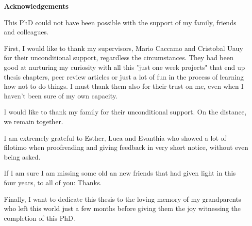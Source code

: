 \thispagestyle{empty}
\LARGE
\textbf{Acknowledgements} 
 \\
\normalsize



This PhD could not have been possible with the support of my family, friends and colleagues. 

First, I would like to thank my supervisors, Mario Caccamo and Cristobal Uauy for their unconditional support, regardless the circumstances. 
They had been good at nurturing my curiosity with all this "just one week projects" that end up thesis chapters, peer review articles or just a lot of fun in the process of learning how not to do things. 
I must thank them also for their trust on me, even when I haven't been sure of my own capacity.

I would like to thank my family for their unconditional support. 
On the distance, we remain together. 

I am extremely grateful to Esther, Luca and Evanthia who showed a lot of filotimo when proofreading and giving feedback in very short notice, without even being asked. 

If I am sure I am missing some old an new friends that had given light in this four years, to all of you: Thanks. 

Finally, I want to dedicate this thesis to the loving memory of my grandparents who left this world just a few months before giving them the joy witnessing the completion of this PhD. 



